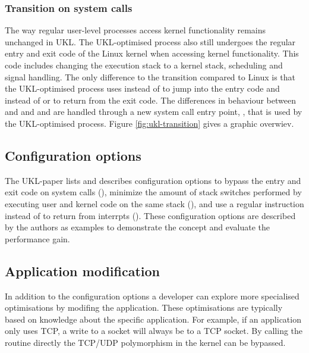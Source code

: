 \documentclass[10pt,twocolumn,a4paper]{article}
\begin{document}
    \subsubsection{Transition on system calls}\label{sec:transition}
      The way regular user-level processes access kernel functionality remains unchanged in UKL.
      The UKL-optimised process also still undergoes the regular entry and exit code of
      the Linux kernel when accessing kernel functionality.
      This code includes changing the execution stack to a kernel stack, scheduling and signal handling.
      The only difference to the transition compared to Linux is that the UKL-optimised process uses
       instead of  to jump into the entry code and  instead
      of  or  to return from the exit code. 
      The differences in behaviour between  and  and 
       and  are handled through a new system call entry point, 
      , that is used by the UKL-optimised process.
      Figure \ref{fig:ukl-transition} gives a graphic overwiev.

      \begin{figure*}[hbt]
        \centering
        
        \caption{Transition between applications and kernel in UKL base model}
        \label{fig:ukl-transition}
      \end{figure*}

  \subsection{Configuration options}\label{sec:configuration-options}
    The UKL-paper lists and describes configuration options to bypass the entry and exit code
    on system calls (), minimize the amount of stack switches performed 
    by executing user and kernel code on the same stack (),
    and use a regular  instruction instead of  to return from 
    interrpts ().
    These configuration options are described by the authors as examples to demonstrate the concept
    and evaluate the performance gain.

  \subsection{Application modification}\label{sec:application-modification}
    In addition to the configuration options a developer can explore more specialised optimisations
    by modifing the application.
    These optimisations are typically based on knowledge about the specific application.
    For example, if an application only uses TCP, a write to a socket will always be to
    a TCP socket.
    By calling the  routine directly the TCP/UDP polymorphism in the kernel
    can be bypassed.
    
\end{document}
